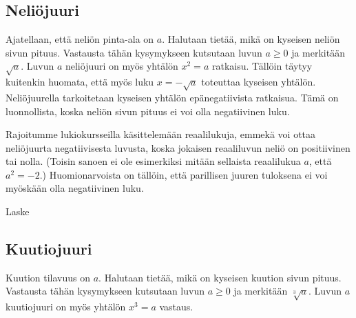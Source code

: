 \subsection*{Neliöjuuri}
\label{neliojuuri}

Ajatellaan, että neliön pinta-ala on $a$. Halutaan tietää, mikä on kyseisen neliön sivun pituus. Vastausta tähän kysymykseen kutsutaan luvun $a\ge 0$  ja merkitään $\sqrt{a}$. Luvun $a$ neliöjuuri on myös yhtälön $x^2 = a$ ratkaisu. Tällöin täytyy kuitenkin huomata, että myös luku $x=-\sqrt{a}$ toteuttaa kyseisen yhtälön. Neliöjuurella tarkoitetaan kyseisen yhtälön epänegatiivista ratkaisua. Tämä on luonnollista, koska neliön sivun pituus ei voi olla negatiivinen luku.


Rajoitumme lukiokursseilla käsittelemään reaalilukuja, emmekä voi ottaa neliöjuurta negatiivisesta luvusta, koska jokaisen reaaliluvun neliö on positiivinen tai nolla. (Toisin sanoen ei ole esimerkiksi mitään sellaista reaalilukua $a$, että $a^2=-2$.) Huomionarvoista on tällöin, että parillisen juuren tuloksena ei voi myöskään olla negatiivinen luku.

\begin{esimerkki}
Laske

\begin{esimratk}

\end{esimratk}
\begin{esimvast}
\end{esimvast}
\end{esimerkki}


\subsection*{Kuutiojuuri}

Kuution tilavuus on $a$. Halutaan tietää, mikä on kyseisen kuution sivun pituus. Vastausta tähän kysymykseen kutsutaan luvun $a\ge 0$  ja merkitään $\sqrt[3]{a}$. Luvun $a$ kuutiojuuri on myös yhtälön $x^3 = a$ vastaus.

